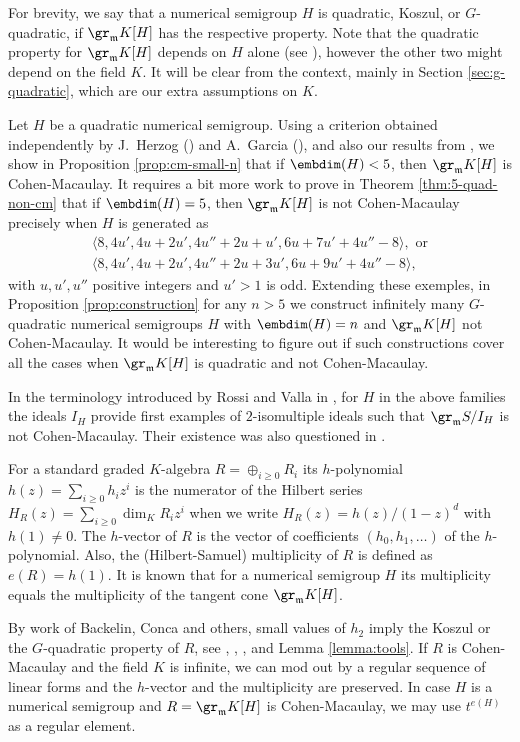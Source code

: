 \documentclass[12pt]{amsart}
\def\frk{\mathfrak}               %
\def\mm{{\frk m}}
\begin{document}
For brevity, we say that a numerical semigroup $H$ is quadratic, Koszul, or $G$-quadratic, if $\gr_\mm K[H]$ has the respective property.
Note that the quadratic property for $\gr_\mm K[H]$ depends on $H$ alone (see  \cite[Theorem 6.8]{RS}), however the other two might depend on the field $K$. 
It will be clear from the context, mainly in Section \ref{sec:g-quadratic}, which are our extra assumptions on $K$.


Let $H$ be a quadratic numerical semigroup.
Using a criterion obtained independently  by J.~Herzog (\cite{He-reg}) and A.~Garcia (\cite{Garcia}), 
and also our  results from \cite{HeS-quad}, we show in Proposition \ref{prop:cm-small-n} that
if $\embdim(H)<5$, then $\gr_\mm K[H]$ is Cohen-Macaulay. 
It requires a bit more work to prove in Theorem \ref{thm:5-quad-non-cm} that if $\embdim(H)=5$,
 then  $\gr_\mm K[H]$ is not Cohen-Macaulay precisely when $H$ is  generated as
\begin{eqnarray*}
 \langle 8, 4u', 4u+2u', 4u''+2u+ u', 6u+7u'+4u''-8 \rangle, \text{ or} \\
 \langle 8, 4u', 4u+2u', 4u''+2u+3u', 6u+9u'+4u''-8 \rangle,
\end{eqnarray*} with $u, u', u''$ positive integers and $u'>1$ is odd.
Extending these exemples, in Proposition \ref{prop:construction}  for any $n> 5$ we construct infinitely many $G$-quadratic numerical semigroups $H$ with
$\embdim(H)=n$ and $\gr_\mm K[H]$ not Cohen-Macaulay. 
It would be interesting to figure out if such constructions cover all the cases when $\gr_\mm K[H]$ is quadratic and not Cohen-Macaulay.

In the terminology introduced by Rossi and Valla in \cite{RossiValla}, for $H$ in the above families the ideals $I_H$ provide  first examples of $2$-isomultiple ideals such that
$\gr_\mm S/I_H$ is not Cohen-Macaulay.  Their existence was also questioned in \cite[Remark 2.3]{RossiValla}.
 
For a standard graded $K$-algebra $R=\oplus_{i\geq 0} R_i$ its $h$-polynomial $h(z)=\sum_{i\geq 0 }h_i z^i$ is the numerator of the Hilbert series 
$H_R(z)=\sum_{i\geq 0} \dim_K R_i z^i$ when we write
$H_R(z)=h(z)/(1-z)^d$ with $h(1)\neq 0$. The $h$-vector of $R$ is the vector of coefficients $(h_0, h_1, \dots)$ of the $h$-polynomial.
Also, the (Hilbert-Samuel) multiplicity of $R$ is defined as $e(R)= h(1)$. It is known that for a numerical semigroup $H$ its multiplicity equals the multiplicity
 of the tangent cone $\gr_\mm K[H]$.
 

By  work of Backelin, Conca and others, small values of $h_2$ imply the Koszul or the $G$-quadratic property of $R$, 
see  \cite{Backelin-thesis}, \cite{Conca-quadrics}, \cite{Conca-quadrics-codim3}, \cite{DAli} and Lemma \ref{lemma:tools}.
If $R$ is Cohen-Macaulay and the field $K$ is infinite, we can mod out by a regular sequence of linear forms and the $h$-vector and  the multiplicity  are preserved.
In case $H$ is a numerical semigroup and  $R=\gr_\mm K[H]$ is Cohen-Macaulay, we may use  $t^{e(H)}$ as a regular element.
\end{document}
